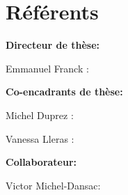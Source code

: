 \documentclass[11pt,a4paper,sans]{moderncv}
\begin{document}
    \section{Référents}

        \textbf{Directeur de thèse:}

        Emmanuel Franck : 
        
        \smallskip
        \textbf{Co-encadrants de thèse:}

        Michel Duprez : 

        Vanessa Lleras : 

        \smallskip
        \textbf{Collaborateur:}

        Victor Michel-Dansac: 
\end{document}

